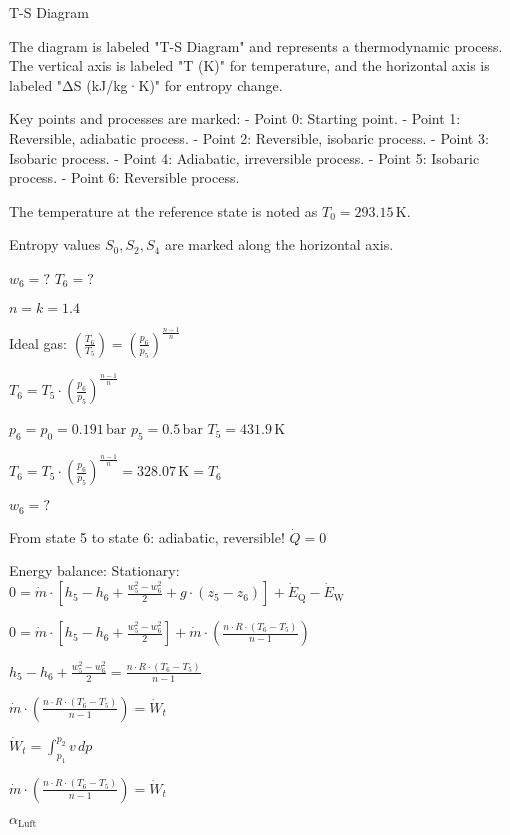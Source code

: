 T-S Diagram  

The diagram is labeled "T-S Diagram" and represents a thermodynamic process. The vertical axis is labeled "T (K)" for temperature, and the horizontal axis is labeled "ΔS (kJ/kg·K)" for entropy change.  

Key points and processes are marked:  
- Point 0: Starting point.  
- Point 1: Reversible, adiabatic process.  
- Point 2: Reversible, isobaric process.  
- Point 3: Isobaric process.  
- Point 4: Adiabatic, irreversible process.  
- Point 5: Isobaric process.  
- Point 6: Reversible process.  

The temperature at the reference state is noted as \( T_0 = 293.15 \, \text{K} \).  

Entropy values \( S_0, S_2, S_4 \) are marked along the horizontal axis.

\( w_6 = ? \)  
\( T_6 = ? \)  

\( n = k = 1.4 \)  

Ideal gas:  
\( \left( \frac{T_6}{T_5} \right) = \left( \frac{p_6}{p_5} \right)^{\frac{n-1}{n}} \)  

\( T_6 = T_5 \cdot \left( \frac{p_6}{p_5} \right)^{\frac{n-1}{n}} \)  

\( p_6 = p_0 = 0.191 \, \text{bar} \)  
\( p_5 = 0.5 \, \text{bar} \)  
\( T_5 = 431.9 \, \text{K} \)  

\( T_6 = T_5 \cdot \left( \frac{p_6}{p_5} \right)^{\frac{n-1}{n}} = 328.07 \, \text{K} = T_6 \)  

\( w_6 = ? \)  

From state 5 to state 6: adiabatic, reversible!  
\( \dot{Q} = 0 \)  

Energy balance:  
Stationary:  
\( 0 = \dot{m} \cdot \left[ h_5 - h_6 + \frac{w_5^2 - w_6^2}{2} + g \cdot (z_5 - z_6) \right] + \dot{E}_{\text{Q}} - \dot{E}_{\text{W}} \)  

\( 0 = \dot{m} \cdot \left[ h_5 - h_6 + \frac{w_5^2 - w_6^2}{2} \right] + \dot{m} \cdot \left( \frac{n \cdot R \cdot (T_6 - T_5)}{n - 1} \right) \)  

\( h_5 - h_6 + \frac{w_5^2 - w_6^2}{2} = \frac{n \cdot R \cdot (T_6 - T_5)}{n - 1} \)  

\( \dot{m} \cdot \left( \frac{n \cdot R \cdot (T_6 - T_5)}{n - 1} \right) = \dot{W}_t \)  

\( \dot{W}_t = \int_{p_1}^{p_2} v \, dp \)  

\( \dot{m} \cdot \left( \frac{n \cdot R \cdot (T_6 - T_5)}{n - 1} \right) = \dot{W}_t \)  

\( \alpha_{\text{Luft}} \)